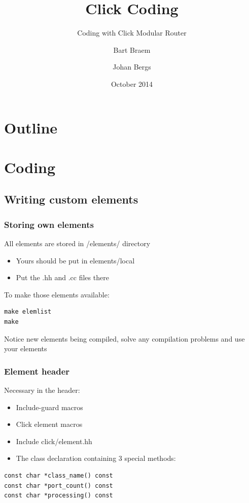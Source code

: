 \documentclass{beamer}
\title{Click Coding}
\subtitle{Coding with Click Modular Router}
\author{Bart Braem \and Johan Bergs}
\institute{University of Antwerp\\iMinds - MOSAIC Research Group}
\date{October 2014}
\begin{document}
\lstset{breakatwhitespace=true}
\lstset{language=C++}
\lstset{columns=fullflexible}
\lstset{keepspaces=true}
\lstset{breaklines=true,
        tabsize=3, 
        showstringspaces=false,
extendedchars=\true}

\begin{frame}[t]
\titlepage
\end{frame}


\section*{Outline}


\section{Coding}
\subsection{Writing custom elements} %
\label{sub:writing_custom_elements}

\begin{frame}[fragile]
	\frametitle{Storing own elements}
All elements are stored in /elements/ directory
\begin{itemize}
	\item Yours should be put in elements/local
	\item Put the .hh and .cc files there
\end{itemize}
To make those elements available:
\begin{lstlisting}
make elemlist
make
\end{lstlisting}
Notice new elements being compiled, solve any compilation problems and use your elements
\end{frame}


\begin{frame}[fragile]
\frametitle{Element header}
Necessary in the header:
\begin{itemize}
	\item Include-guard macros
	\item Click element macros
	\item Include click/element.hh
	\item The class declaration containing 3 special methods:
\end{itemize}
\begin{lstlisting}
const char *class_name() const
const char *port_count() const
const char *processing() const
\end{lstlisting}
\end{frame}
\end{document}
